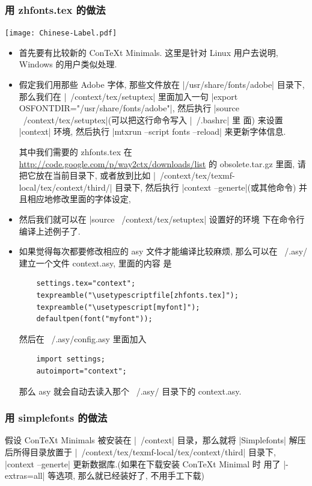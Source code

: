 \documentclass{ctexbook}
\begin{document}
\subsubsection{用 zhfonts.tex 的做法}
\begin{center}\texttt{[image: Chinese-Label.pdf]}\end{center}%

\begin{itemize}
\item 首先要有比较新的 ConTeXt  Minimals. 这里是针对 Linux 用户去说明,
  Windows 的用户类似处理.

\item 假定我们用那些 Adobe 字体, 那些文件放在 |/usr/share/fonts/adobe|
  目录下, 那么我们在   |~/context/tex/setuptex| 里面加入一句
  |export  OSFONTDIR="/usr/share/fonts/adobe"|, 然后执行
  |source  ~/context/tex/setuptex|(可以把这行命令写入 |~/.bashrc| 里
  面) 来设置 |context| 环境, 然后执行
  |mtxrun --script fonts --reload| 来更新字体信息.

  其中我们需要的 zhfonts.tex 在
  \url{http://code.google.com/p/way2ctx/downloads/list} 的
  obsolete.tar.gz 里面, 请把它放在当前目录下, 或者放到比如
  |~/context/tex/texmf-local/tex/context/third/| 目录下, 然后执行
  |context --generte|(或其他命令) 并且相应地修改里面的字体设定,

\item  然后我们就可以在 |source  ~/context/tex/setuptex| 设置好的环境
  下在命令行编译上述例子了.
\item 如果觉得每次都要修改相应的 asy 文件才能编译比较麻烦, 那么可以在
  ~/.asy/ 建立一个文件 context.asy, 里面的内容
  是  \label{ConTeXt:Settings}
  \begin{lstlisting}
    settings.tex="context";
    texpreamble("\usetypescriptfile[zhfonts.tex]");
    texpreamble("\usetypescript[myfont]");
    defaultpen(font("myfont"));
  \end{lstlisting}
  然后在 ~/.asy/config.asy 里面加入
  \begin{lstlisting}
    import settings;
    autoimport="context";
  \end{lstlisting}
  那么 asy 就会自动去读入那个 ~/.asy/ 目录下的 context.asy.
\end{itemize}
\subsubsection{用 simplefonts 的做法}
假设 ConTeXt Minimals 被安装在 |~/context| 目录，那么就将
|Simplefonts| 解压后所得目录放置于
|~/context/tex/texmf-local/tex/context/third| 目录下,
|context --generte| 更新数据库.(如果在下载安装 ConTeXt Minimal 时
用了 |-extras=all| 等选项, 那么就已经装好了, 不用手工下载)
\end{document}
